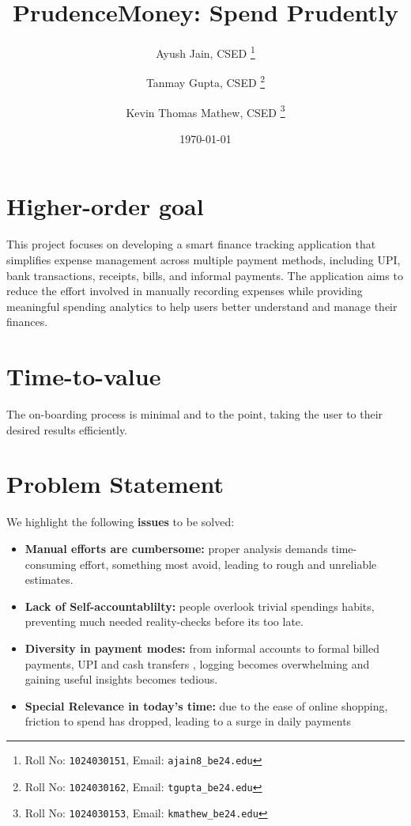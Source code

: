 \documentclass[11pt,a4paper]{article}
\title{PrudenceMoney: Spend Prudently}
\author{
  Ayush Jain, CSED%
  \thanks{Roll No: \texttt{1024030151}, 
    Email: \texttt{ajain8\_be24\@thapar.edu}}
  \and 
  Tanmay Gupta, CSED%
  \thanks{Roll No: \texttt{1024030162}, 
    Email: \texttt{tgupta\_be24\@thapar.edu}}
  \and
  Kevin Thomas Mathew, CSED%
  \thanks{Roll No: \texttt{1024030153}, 
    Email: \texttt{kmathew\_be24\@thapar.edu}}
}
\date{\today}
\begin{document}
\maketitle

\section{Higher-order goal%
}
This project focuses on developing a smart finance tracking application that simplifies expense management across multiple payment methods, including UPI, bank transactions, receipts, bills, and informal payments. The application aims to reduce the effort involved in manually recording expenses while providing meaningful spending analytics to help users better understand and manage their finances.

\section{Time-to-value %
}
The on-boarding process is minimal and to the point, taking the user to their desired results efficiently.


\section{Problem Statement}
We highlight the following \textbf{issues} to be solved:
\begin{itemize}[leftmargin=0.7cm]
    \item \textbf{Manual efforts are cumbersome:} proper analysis demands time-consuming effort, something most avoid, leading to rough and unreliable estimates.
    \item \textbf{Lack of Self-accountablilty:} people overlook trivial spendings habits, preventing much needed reality-checks before its too late.
    \item \textbf{Diversity in payment modes:} from informal accounts to formal billed payments, UPI and cash transfers , logging becomes overwhelming and gaining useful insights becomes tedious.
    \item \textbf{Special Relevance in today's time:} due to the ease of online shopping, friction to spend has dropped, leading to a surge in daily payments
\end{itemize}
\end{document}
